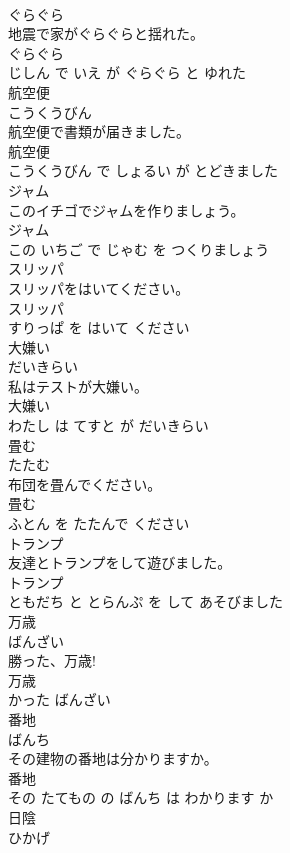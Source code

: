 \documentclass[8pt]{extreport}
\begin{document}
\begin{CJK}{UTF8}{min}
\\	ぐらぐら	
\\	地震で家がぐらぐらと揺れた。	
\\	ぐらぐら 
\\	じしん で いえ が ぐらぐら と ゆれた			
\\	航空便	
\\	こうくうびん			
\\	航空便で書類が届きました。	
\\	航空便 
\\	こうくうびん で しょるい が とどきました			
\\	ジャム	
\\	このイチゴでジャムを作りましょう。	
\\	ジャム 
\\	この いちご で じゃむ を つくりましょう			
\\	スリッパ	
\\	スリッパをはいてください。	
\\	スリッパ 
\\	すりっぱ を はいて ください			
\\	大嫌い	
\\	だいきらい			
\\	私はテストが大嫌い。	
\\	大嫌い 
\\	わたし は てすと が だいきらい			
\\	畳む	
\\	たたむ			
\\	布団を畳んでください。	
\\	畳む 
\\	ふとん を たたんで ください			
\\	トランプ	
\\	友達とトランプをして遊びました。	
\\	トランプ 
\\	ともだち と とらんぷ を して あそびました			
\\	万歳	
\\	ばんざい			
\\	勝った、万歳!	
\\	万歳 
\\	かった ばんざい			
\\	番地	
\\	ばんち			
\\	その建物の番地は分かりますか。	
\\	番地 
\\	その たてもの の ばんち は わかります か			
\\	日陰	
\\	ひかげ			

\end{CJK}
\end{document}
